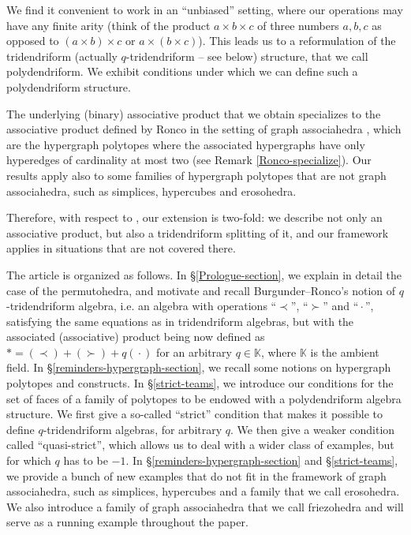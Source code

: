 \documentclass[11pt]{article}
\theoremstyle{definition}
\numberwithin{equation}{section}
\numberwithin{equation}{section}
\newcommand{\bcdot}{\,{\bm \cdot}\,}
\begin{document}
We find it convenient to work in an  ``unbiased'' setting, where our operations may have any finite arity (think of the product $a\times b\times c$ of three numbers $a,b,c$ as opposed to $(a \times b)\times c$ or $a\times (b\times c)$). This leads us to a reformulation of the tridendriform  (actually $q$-tridendriform  -- see below) structure, that we call polydendriform.  We exhibit conditions under which we can define such a polydendriform structure.

The underlying (binary) associative product that we obtain specializes to the associative product defined by Ronco \cite{RoncoGTO} in the setting of graph associahedra \cite{CD-CCGA}, which are the hypergraph polytopes where the associated hypergraphs have only hyperedges of cardinality at most two (see Remark \ref{Ronco-specialize}). Our results apply also  to some families of hypergraph polytopes that are not graph associahedra, such as simplices, hypercubes and erosohedra.
 
 Therefore, with respect to  \cite{RoncoGTO}, our extension is two-fold:  we describe not only an associative product, but also a tridendriform splitting of it, and our framework applies in situations that are not covered there.

The article is organized as follows. 
In  \S\ref{Prologue-section}, we explain in detail the case of the permutohedra,
and motivate and recall Burgunder--Ronco's notion of $q$-tridendriform algebra, i.e.  an algebra with operations ``$\prec$'', ``$\succ$'' and ``$\bcdot$'',  satisfying the same equations as in tridendriform algebras, but with the associated (associative) product being now defined as $\ast = (\prec) + (\succ) + q( \bcdot)$  for an arbitrary $q \in \mathbb{K}$, where $\mathbb{K}$ is the ambient field.
In \S\ref{reminders-hypergraph-section}, we recall some notions on hypergraph polytopes and constructs.
In \S\ref{strict-teams}, we introduce our conditions for  the set of faces of a family of polytopes to be endowed with a polydendriform algebra structure. We first give a so-called ``strict'' condition  that makes it possible to define $q$-tridendriform algebras, for arbitrary $q$. We then give a weaker condition called ``quasi-strict'', which allows us to deal with a wider class of examples, but for which $q$ has to be $-1$.  In \S\ref{reminders-hypergraph-section} and \S\ref{strict-teams}, we provide a bunch of new examples that do not fit in the framework of graph associahedra, such as simplices, hypercubes and a family that we call erosohedra. We also introduce a family of graph associahedra that we call friezohedra and will serve as a running example throughout the paper.
\end{document}
